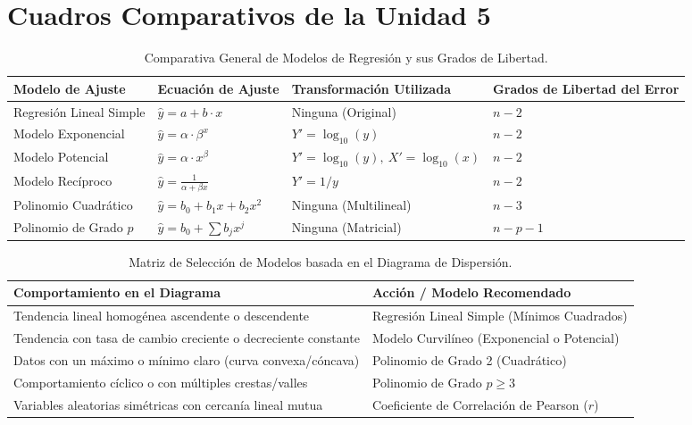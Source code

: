 \documentclass[11pt,letterpaper]{article}
\begin{document}
\newpage

\section{Cuadros Comparativos de la Unidad 5}

\begin{table}[htbp]
    \centering
    \fontsize{9}{12}\selectfont
    \begin{tabular}{llll}
        \toprule
        \textbf{Modelo de Ajuste} & \textbf{Ecuación de Ajuste} & \textbf{Transformación Utilizada} & \textbf{Grados de Libertad del Error} \\
        \midrule
        Regresión Lineal Simple & $\hat{y} = a + b \cdot x$ & Ninguna (Original) & $n - 2$ \\
        Modelo Exponencial & $\hat{y} = \alpha \cdot \beta^x$ & $Y' = \log_{10}(y)$ & $n - 2$ \\
        Modelo Potencial & $\hat{y} = \alpha \cdot x^\beta$ & $Y' = \log_{10}(y), \ X' = \log_{10}(x)$ & $n - 2$ \\
        Modelo Recíproco & $\hat{y} = \frac{1}{\alpha + \beta x}$ & $Y' = 1/y$ & $n - 2$ \\
        Polinomio Cuadrático & $\hat{y} = b_0 + b_1 x + b_2 x^2$ & Ninguna (Multilineal) & $n - 3$ \\
        Polinomio de Grado $p$ & $\hat{y} = b_0 + \sum b_j x^j$ & Ninguna (Matricial) & $n - p - 1$ \\
        \bottomrule
    \end{tabular}
    \caption{Comparativa General de Modelos de Regresión y sus Grados de Libertad.}
    \label{tab:comparativa_modelos}
\end{table}

\begin{table}[htbp]
    \centering
    \fontsize{10}{13}\selectfont
    \begin{tabular}{ll}
        \toprule
        \textbf{Comportamiento en el Diagrama} & \textbf{Acción / Modelo Recomendado} \\
        \midrule
        Tendencia lineal homogénea ascendente o descendente & Regresión Lineal Simple (Mínimos Cuadrados) \\
        Tendencia con tasa de cambio creciente o decreciente constante & Modelo Curvilíneo (Exponencial o Potencial) \\
        Datos con un máximo o mínimo claro (curva convexa/cóncava) & Polinomio de Grado 2 (Cuadrático) \\
        Comportamiento cíclico o con múltiples crestas/valles & Polinomio de Grado $p \ge 3$ \\
        Variables aleatorias simétricas con cercanía lineal mutua & Coeficiente de Correlación de Pearson ($r$) \\
        \bottomrule
    \end{tabular}
    \caption{Matriz de Selección de Modelos basada en el Diagrama de Dispersión.}
    \label{tab:seleccion_modelos}
\end{table}
\end{document}
